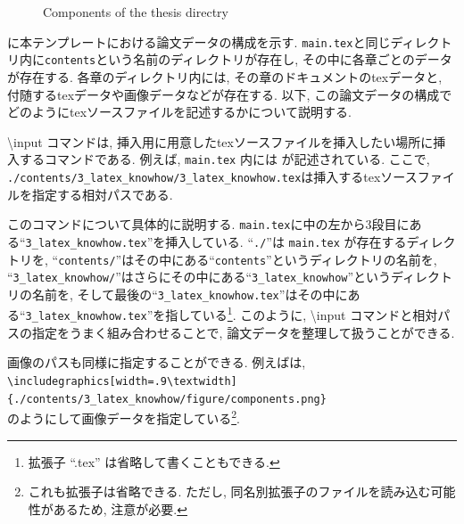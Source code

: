 \begin{figure}[htbp]
  \centering
  \caption{Components of the thesis directry}
\end{figure}

に本テンプレートにおける論文データの構成を示す. \verb|main.tex|と同じディレクトリ内に\verb|contents|という名前のディレクトリが存在し, その中に各章ごとのデータが存在する. 各章のディレクトリ内には, その章のドキュメントのtexデータと, 付随するtexデータや画像データなどが存在する. 以下, この論文データの構成でどのようにtexソースファイルを記述するかについて説明する. 

\textbackslash input コマンドは, 挿入用に用意したtexソースファイルを挿入したい場所に挿入するコマンドである. 
例えば, \verb|main.tex| 内には
\verb|| 
が記述されている. ここで, \verb|./contents/3_latex_knowhow/3_latex_knowhow.tex|は挿入するtexソースファイルを指定する相対パスである. 

このコマンドについて具体的に説明する. \verb|main.tex|に中の左から3段目にある``\verb|3_latex_knowhow.tex|''を挿入している. ``\verb|./|''は \verb|main.tex| が存在するディレクトリを, ``\verb|contents/|''はその中にある``\verb|contents|''というディレクトリの名前を, ``\verb|3_latex_knowhow/|''はさらにその中にある``\verb|3_latex_knowhow|''というディレクトリの名前を, そして最後の``\verb|3_latex_knowhow.tex|''はその中にある``\verb|3_latex_knowhow.tex|''を指している\footnote{
拡張子 ``.tex'' は省略して書くこともできる. 
}. このように, \textbackslash input コマンドと相対パスの指定をうまく組み合わせることで, 論文データを整理して扱うことができる. 

画像のパスも同様に指定することができる. 例えばは, \\
\verb|\includegraphics[width=.9\textwidth]|\\
\verb|{./contents/3_latex_knowhow/figure/components.png}|\\
のようにして画像データを指定している\footnote{
これも拡張子は省略できる. ただし, 同名別拡張子のファイルを読み込む可能性があるため, 注意が必要. 
}. 

